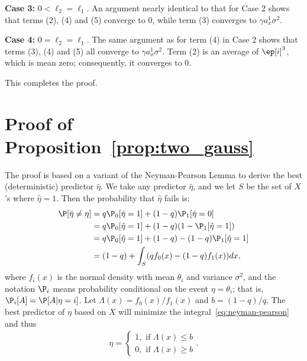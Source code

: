 \documentclass[9pt,twocolumn,twoside,lineno]{pnas-new}
\begin{document}
{\bf Case 3:} $0<\ell_2 = \ell_1$. An argument nearly identical to that for Case 2 shows that terms (2), (4) and (5) converge to 0, while term (3) converges to $\gamma a_x^1 \sigma^2$.

{\bf Case 4:} $0=\ell_2 = \ell_1$. The same argument as for term (4) in Case 2 shows that terms (3), (4) and (5) all converge to $\gamma a_x^1 \sigma^2$. Term (2) is an average of $\ep[i]^3$, which is mean zero; consequently, it converges to 0.

This completes the proof.

\section{Proof of Proposition~\ref{prop:two_gauss}} \label{sec:proof_two_gauss}

The proof is based on  a variant of the Neyman-Pearson Lemma to derive the best (deterministic) predictor $\hat{\eta}$. We take any predictor $\hat{\eta}$, and we let $S$ be the set of $X$'s where $\hat{\eta} = 1$. Then the probability that $\hat{\eta}$ fails is:
%
\begin{align}
\label{eq:neyman-pearson}
%
\P[\hat{\eta} \ne \eta] 
&= q \P_0[\hat{\eta} = 1 ] + (1-q) \P_1[\hat{\eta} = 0]
\nonumber \\
&= q \P_0[\hat{\eta} = 1] + (1-q) (1 - \P_1[\hat{\eta} = 1])
\nonumber \\
&= q \P_0[\hat{\eta} = 1] + (1-q) - (1-q) \P_1[\hat{\eta} = 1]
\nonumber \\
&= (1-q)  + \int_S (q f_0(x) - (1-q) f_1(x))dx,
%
\end{align}
%
where $f_i(x)$ is the normal density with mean $\theta_i$ and variance $\sigma^2$, and the notation $\P_i$ means probability conditional on the event $\eta = \theta_i$; that is, $\P_i[A] = \P[A | \eta=i]$. 
Let $\Lambda(x) = f_0(x) / f_1(x)$ and $b = (1-q) / q$,
The best predictor of $\eta$ based on $X$ will minimize the integral~\eqref{eq:neyman-pearson} and thus 
%
%
\begin{align}
%
\eta = 
\begin{cases}
1,  \text{ if } \Lambda(x) \le b \\
0,  \text{ if } \Lambda(x) \ge b
\end{cases}.
%
\end{align}
\end{document}
